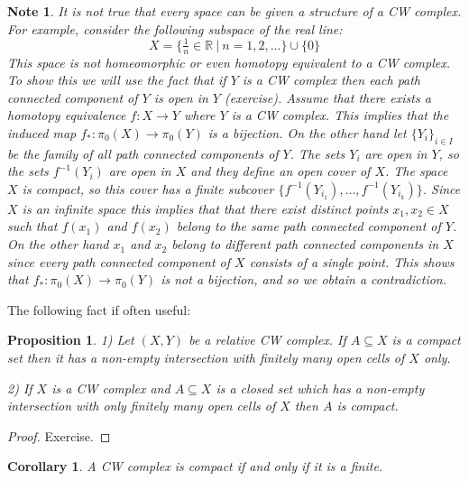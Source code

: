 \documentclass[11pt, letterpaper, oneside]{report}
\theoremstyle{pplain}
\newtheorem{proposition}[theorem]{Proposition}
\newtheorem{corollary}[theorem]{Corollary}
\theoremstyle{ddefinition}
\newtheorem{note}[theorem]{Note}
\theoremstyle{nnn}
\theoremstyle{eexercise}
\newcommand{\R}{{\mathbb R}}
\begin{document}
\begin{note}
It is not true that every space can be given a structure of a CW complex. 
For example, 
consider the following subspace of the real line:
$$X = \{\tfrac{1}{n} \in \R \ | \ n = 1, 2, \dots \} \cup \{0\}$$
This space is not homeomorphic or even homotopy equivalent to a CW complex.
To show this we will use the fact that if $Y$ is a CW complex then each path connected component of $Y$
is open in $Y$ (exercise). Assume  that there exists a homotopy equivalence $f\colon X \to Y$ where 
$Y$ is a CW complex. This implies that the induced map $f_{\ast}\colon \pi_{0}(X) \to \pi_{0}(Y)$
is a bijection. On the other hand let $\{Y_{i}\}_{i\in I}$ be the family of all path connected components 
of $Y$. The sets $Y_{i}$ are open in $Y$, so the sets $f^{-1}(Y_{i})$ are open in $X$ 
and they define an open cover of $X$.  The space $X$ is compact, so this cover has a finite subcover 
$\{f^{-1}(Y_{i_{1}}), \dots, f^{-1}(Y_{i_{k}})\}$. Since $X$ is an infinite space this implies that that 
there exist distinct points  $x_{1}, x_{2}\in X$ such that $f(x_{1})$ and $f(x_{2})$
belong to the same path connected component of $Y$. On the other hand $x_{1}$ and $x_{2}$
belong to different path connected components in $X$ since every path connected component of $X$
consists of a single point. This shows that $f_{\ast}\colon \pi_{0}(X) \to \pi_{0}(Y)$ is not a bijection, 
and so we obtain a contradiction. 


\end{note}


The following fact if often useful: 


\begin{proposition}
\label{COMPACT CW COMPLEX PROP}
1) Let $(X, Y)$ be a relative CW complex. If $A\subseteq X$ is a compact set then it has a non-empty intersection with  finitely many open cells of $X$ only.  

2) If $X$ is a CW complex and $A\subseteq X$ is a closed set which has a non-empty intersection 
with  only finitely many open cells of $X$  then $A$ is compact. 
\end{proposition}

\begin{proof}
Exercise. 
\end{proof}


\begin{corollary}
\label{FINITE CW COMPACT COR}
A CW complex is compact if and only if it is a finite. 
\end{corollary}
\end{document}
